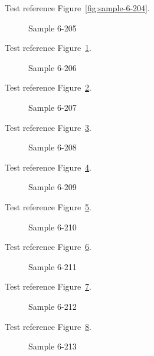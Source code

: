 Test reference Figure~\ref{fig:sample-6-204}.

\begin{figure}[tbhp]
\caption{Sample 6-205}
\label{fig:sample-6-205}
\end{figure}

Test reference Figure~\ref{fig:sample-6-205}.

\begin{figure}[tbhp]
\caption{Sample 6-206}
\label{fig:sample-6-206}
\end{figure}

Test reference Figure~\ref{fig:sample-6-206}.

\begin{figure}[tbhp]
\caption{Sample 6-207}
\label{fig:sample-6-207}
\end{figure}

Test reference Figure~\ref{fig:sample-6-207}.

\begin{figure}[tbhp]
\caption{Sample 6-208}
\label{fig:sample-6-208}
\end{figure}

Test reference Figure~\ref{fig:sample-6-208}.

\begin{figure}[tbhp]
\caption{Sample 6-209}
\label{fig:sample-6-209}
\end{figure}

Test reference Figure~\ref{fig:sample-6-209}.

\begin{figure}[tbhp]
\caption{Sample 6-210}
\label{fig:sample-6-210}
\end{figure}

Test reference Figure~\ref{fig:sample-6-210}.

\begin{figure}[tbhp]
\caption{Sample 6-211}
\label{fig:sample-6-211}
\end{figure}

Test reference Figure~\ref{fig:sample-6-211}.

\begin{figure}[tbhp]
\caption{Sample 6-212}
\label{fig:sample-6-212}
\end{figure}

Test reference Figure~\ref{fig:sample-6-212}.

\begin{figure}[tbhp]
\caption{Sample 6-213}
\label{fig:sample-6-213}
\end{figure}

